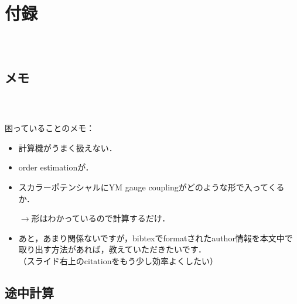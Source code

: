 \documentclass[
  a4paper,uplatex,dvipdfmx,10pt,
  xcolor = {dvipsnames,svgnames},
  hyperref ={colorlinks=true,citecolor=Navy,linkcolor=NavyBlue,urlcolor=purple}
]{beamer}
\renewcommand{\thefigure}{\thesection.\arabic{figure}}
\renewcommand{\thetable}{\thesection.\arabic{table}}
\begin{document}
   \renewcommand{\thefigure}{\thesubsection.\arabic{figure}}
   
   \renewcommand{\thetable}{\thesubsection.\arabic{table}}
\makeatother

\section{付録}

\begin{frame}[plain]
  \frametitle{\ }
  \huge \secname
\end{frame}


\subsection{メモ}

\begin{frame}[plain]
  \frametitle{\secname\thesubsection\ \subsecname}

  困っていることのメモ：

  \begin{itemize}
    \item 
    計算機がうまく扱えない．

    \item 
    order estimationが．

    \item 
    \color{gray}スカラーポテンシャルにYM gauge couplingがどのような形で入ってくるか．

    $\longrightarrow$形はわかっているので計算するだけ．
    \color{black}   

    \item 
    あと，あまり関係ないですが，bibtexでformatされたauthor情報を本文中で取り出す方法があれば，教えていただきたいです．
    \\
    （スライド右上のcitationをもう少し効率よくしたい）
  \end{itemize}

\end{frame}


\subsection{途中計算}
\label{detail}
\end{document}
